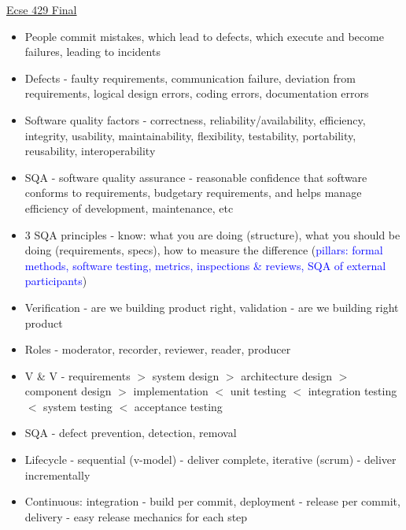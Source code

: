 \documentclass[10pt]{article}
\begin{document}
\raggedright
\footnotesize
\begin{multicols}{2}

	\setlength{\premulticols}{1pt}
	\setlength{\postmulticols}{1pt}
	\setlength{\multicolsep}{10pt}
	\setlength{\columnsep}{2pt}

	\begin{center}
		\Large{\underline{Ecse 429 Final}} \\
    \end{center}
    
    \begin{itemize}
        \item People commit mistakes, which lead to defects, which execute and become failures, leading to incidents
        \item Defects - faulty requirements, communication failure, deviation from requirements, logical design errors, coding errors, documentation errors
        \item Software quality factors - correctness, reliability/availability, efficiency, integrity, usability, maintainability, flexibility, testability, portability, reusability, interoperability
        \item SQA - software quality assurance - reasonable confidence that software conforms to requirements, budgetary requirements, and helps manage efficiency of development, maintenance, etc
        \item 3 SQA principles - know: what you are doing (structure), what you should be doing (requirements, specs), how to measure the difference (\textcolor{blue}{pillars: formal methods, software testing, metrics, inspections \& reviews, SQA of external participants})
        \item Verification - are we building product right, validation - are we building right product
        \item Roles - moderator, recorder, reviewer, reader, producer
        \item V \& V - requirements $>$ system design $>$ architecture design $>$ component design $>$ implementation $<$ unit testing $<$ integration testing $<$ system testing $<$ acceptance testing
        \item SQA - defect prevention, detection, removal
        \item Lifecycle - sequential (v-model) - deliver complete, iterative (scrum) - deliver incrementally
        \item Continuous: integration - build per commit, deployment - release per commit, delivery - easy release mechanics for each step

\end{itemize}
\end{multicols}
\end{document}
